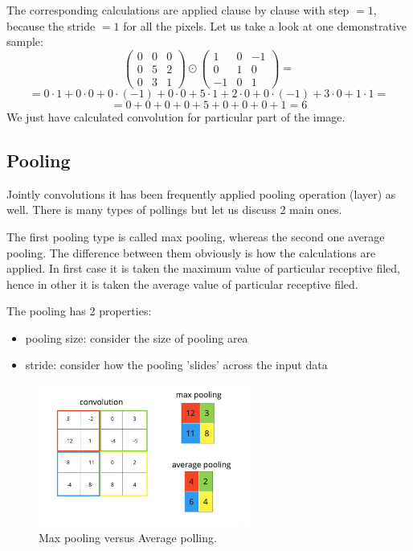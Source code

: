 The corresponding calculations are applied clause by clause with step $= 1$, because the stride $= 1$ for all the pixels. Let us take a look at one demonstrative sample:   
\[ \begin{pmatrix} 0 & 0 & 0 \\ 0 & 5 & 2 \\ 0 & 3 & 1 \end{pmatrix} \odot \begin{pmatrix} 1 & 0 & -1 \\ 0 & 1 & 0 \\ -1 & 0 & 1 \end{pmatrix} = \]
\[ = 0 \cdot 1 + 0 \cdot 0 + 0 \cdot (-1) + 0 \cdot 0 + 5 \cdot 1 + 2 \cdot 0 + 0 \cdot (-1) + 3 \cdot 0 + 1 \cdot 1 = \] 
\[ = 0 + 0 + 0 + 0 + 5 + 0 + 0 + 0 + 1= 6 \]
We just have calculated convolution for particular part of the image. 

\subsection{Pooling}
Jointly convolutions it has been frequently applied pooling operation (layer) as well. There is many types of pollings but let us discuss 2 main ones. 

The first pooling type is called max pooling, whereas the second one average pooling. The difference between them obviously is how the calculations are applied. In first case it is taken the maximum value of particular receptive filed, hence in other it is taken the average value of particular receptive filed.

The pooling has 2 properties:
\begin{itemize}
    \item pooling size: consider the size of pooling area 
    \item stride: consider how the pooling 'slides' across the input data 
\end{itemize}    

\begin{figure}[h]
    \centering \includegraphics[width=7cm]{images/pooling.jpg}
    \caption {Max pooling versus Average polling.}
\end{figure}

